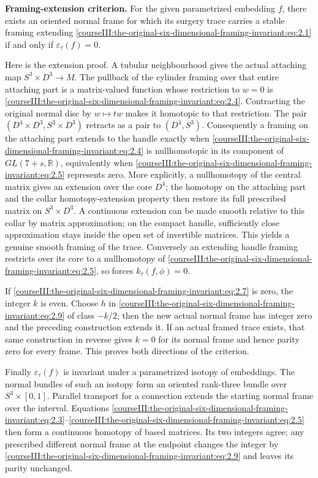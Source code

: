 \textbf{Framing-extension criterion.} For the given parametrized embedding \(f\), there exists an oriented normal frame for which its surgery trace carries a stable framing extending \eqref{courseIII:the-original-six-dimensional-framing-invariant:eq:2.1} if and only if \(\varepsilon_\tau(f)=0\).

Here is the extension proof. A tubular neighbourhood gives the actual attaching map \(S^3\times D^3\to M\). The pullback of the cylinder framing over that entire attaching part is a matrix-valued function whose restriction to \(w=0\) is \eqref{courseIII:the-original-six-dimensional-framing-invariant:eq:2.4}. Contracting the original normal disc by \(w\mapsto tw\) makes it homotopic to that restriction. The pair
\((D^4\times D^3,S^3\times D^3)\)
retracts as a pair to \((D^4,S^3)\). Consequently a framing on the attaching part extends to the handle exactly when \eqref{courseIII:the-original-six-dimensional-framing-invariant:eq:2.4} is nullhomotopic in its component of \(GL(7+s,\mathbb R)\), equivalently when \eqref{courseIII:the-original-six-dimensional-framing-invariant:eq:2.5} represents zero. More explicitly, a nullhomotopy of the central matrix gives an extension over the core \(D^4\); the homotopy on the attaching part and the collar homotopy-extension property then restore its full prescribed matrix on \(S^3\times D^3\). A continuous extension can be made smooth relative to this collar by matrix approximation; on the compact handle, sufficiently close approximation stays inside the open set of invertible matrices. This yields a genuine smooth framing of the trace. Conversely an extending handle framing restricts over its core to a nullhomotopy of \eqref{courseIII:the-original-six-dimensional-framing-invariant:eq:2.5}, so forces \(k_\tau(f,\phi)=0\).

If \eqref{courseIII:the-original-six-dimensional-framing-invariant:eq:2.7} is zero, the integer \(k\) is even. Choose \(h\) in \eqref{courseIII:the-original-six-dimensional-framing-invariant:eq:2.9} of class \(-k/2\); then the new actual normal frame has integer zero and the preceding construction extends it. If an actual framed trace exists, that same construction in reverse gives \(k=0\) for its normal frame and hence parity zero for every frame. This proves both directions of the criterion.

Finally \(\varepsilon_\tau(f)\) is invariant under a parametrized isotopy of embeddings. The normal bundles of such an isotopy form an oriented rank-three bundle over \(S^3\times[0,1]\). Parallel transport for a connection extends the starting normal frame over the interval. Equations \eqref{courseIII:the-original-six-dimensional-framing-invariant:eq:2.3}--\eqref{courseIII:the-original-six-dimensional-framing-invariant:eq:2.5} then form a continuous homotopy of based matrices. Its two integers agree; any prescribed different normal frame at the endpoint changes the integer by \eqref{courseIII:the-original-six-dimensional-framing-invariant:eq:2.9} and leaves its parity unchanged.

